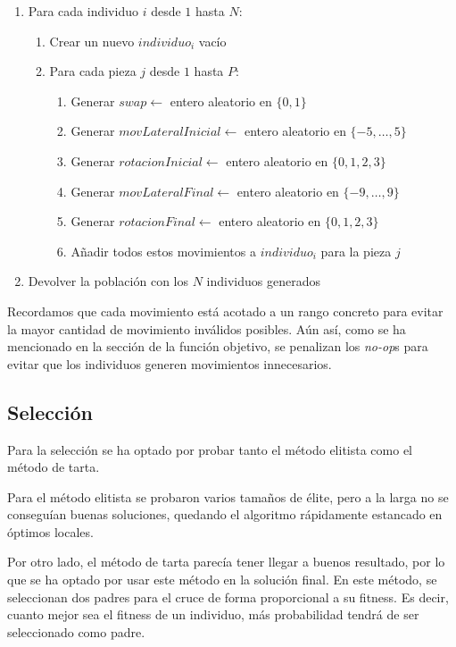\documentclass[11pt,spanish,listoffigures,listoftables]{tfgetsinf}
\begin{document}
\begin{enumerate}
    \item Para cada individuo $i$ desde $1$ hasta $N$:
    \begin{enumerate}
        \item Crear un nuevo $individuo_i$ vacío
        \item Para cada pieza $j$ desde $1$ hasta $P$:
        \begin{enumerate}
            \item Generar $swap \gets$ entero aleatorio en $\{0, 1\}$
            \item Generar $movLateralInicial \gets$ entero aleatorio en $\{-5, \dots, 5\}$
            \item Generar $rotacionInicial \gets$ entero aleatorio en $\{0, 1, 2, 3\}$
            \item Generar $movLateralFinal \gets$ entero aleatorio en $\{-9, \dots, 9\}$
            \item Generar $rotacionFinal \gets$ entero aleatorio en $\{0, 1, 2, 3\}$
            \item Añadir todos estos movimientos a $individuo_i$ para la pieza $j$
        \end{enumerate}
    \end{enumerate}
    \item Devolver la población con los $N$ individuos generados
\end{enumerate}

Recordamos que cada movimiento está acotado a un rango concreto para evitar la mayor cantidad de movimiento inválidos posibles. Aún así, como se ha mencionado en la sección de la función objetivo, se penalizan los \textit{no-op}s para evitar que los individuos generen movimientos innecesarios.

\subsection{Selección}
Para la selección se ha optado por probar tanto el método elitista como el método de tarta. 

Para el método elitista se probaron varios tamaños de élite, pero a la larga no se conseguían buenas soluciones, quedando el algoritmo rápidamente estancado en óptimos locales. 

Por otro lado, el método de tarta parecía tener llegar a buenos resultado, por lo que se ha optado por usar este método en la solución final. En este método, se seleccionan dos padres para el cruce de forma proporcional a su fitness. Es decir, cuanto mejor sea el fitness de un individuo, más probabilidad tendrá de ser seleccionado como padre.
\end{document}
